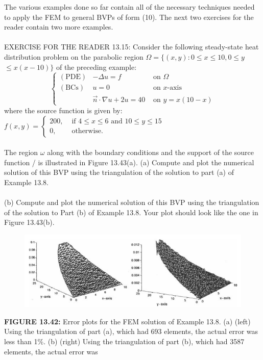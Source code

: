 \documentclass[../main.tex]{subfiles}
\begin{document}
The various examples done so far contain all of the necessary techniques needed 
to apply the FEM to general BVPs of form (10). The next two exercises for the 
reader contain two more examples. 
\\
\\
EXERCISE FOR THE READER 13.15: Consider the following steady-state heat distribution problem on the parabolic region $\Omega=\{(x, y): 0 \leq x \leq 10,0 \leq y$ $\leq x(x-10)\}$ of the preceding example:
$$
\left\{\begin{array}{ccl}
(\mathrm{PDE}) & -\Delta u=f & \text { on } \Omega \\
(\mathrm{BCs}) & u=0 & \text { on } x \text {-axis } \\
& \vec{n} \cdot \nabla u+2 u=40 & \text { on } y=x(10-x)
\end{array}\right.
$$
where the source function is given by: $f(x, y)= \begin{cases}200, & \text { if } 4 \leq x \leq 6 \text { and } 10 \leq y \leq 15 \\ 0, & \text { otherwise. }\end{cases}$
\\
\\
The region $\omega$ along with the boundary conditions and the support of the source 
function / is illustrated in Figure 13.43(a). 
(a) Compute and plot the numerical solution of this BVP using the triangulation of 
the solution to part (a) of Example 13.8. 
\\
\\
(b) Compute and plot the numerical solution of this BVP using the triangulation of 
the solution to Part (b) of Example 13.8. Your plot should look like the one in 
Figure 13.43(b). 
\begin{figure}[H]
\includegraphics[width=0.9\linewidth]{29}
	\centering
	\label{pfig:ch13_29}
\end{figure}
\textbf{FIGURE 13.42:} Error plots for the FEM solution of Example 13.8. (a) (left) Using the 
triangulation of part (a), which had 693 elements, the actual error was less than 1\%. (b) 
(right) Using the triangulation of part (b), which had 3587 elements, the actual error was 
\end{document}
